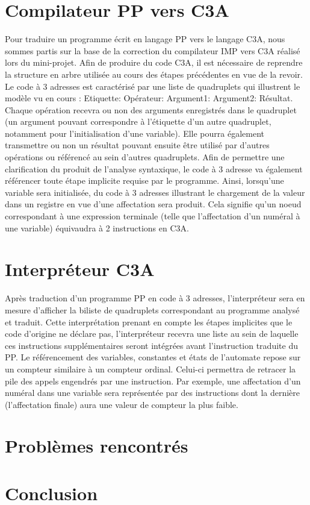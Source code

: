 \documentclass[11pt,a4paper]{article}
\begin{document}
\section{Compilateur PP vers C3A}
Pour traduire un programme écrit en langage PP vers le langage C3A, nous sommes partis sur la base de la correction du compilateur IMP vers C3A réalisé lors du mini-projet.
Afin de produire du code C3A, il est nécessaire de reprendre la structure en arbre utilisée au cours des étapes précédentes en vue de la revoir.
Le code à 3 adresses est caractérisé par une liste de quadruplets qui illustrent le modèle vu en cours :
Etiquette: Opérateur: Argument1: Argument2: Résultat.
Chaque opération recevra ou non des arguments enregistrés dans le quadruplet (un argument pouvant correspondre à l'étiquette d'un autre quadruplet, notamment pour l'initialisation d'une variable).
Elle pourra également transmettre ou non un résultat pouvant ensuite être utilisé par d'autres opérations ou référencé au sein d'autres quadruplets.
Afin de permettre une clarification du produit de l'analyse syntaxique, le code à 3 adresse va également référencer toute étape implicite requise par le programme.
Ainsi, lorsqu'une variable sera initialisée, du code à 3 adresses illustrant le chargement de la valeur dans un registre en vue d'une affectation sera produit.
Cela signifie qu'un noeud correspondant à une expression terminale (telle que l'affectation d'un numéral à une variable) équivaudra à 2 instructions en C3A.

\section{Interpréteur C3A}
Après traduction d'un programme PP en code à 3 adresses, l'interpréteur sera en mesure d'afficher la biliste de quadruplets correspondant au programme analysé et traduit.
Cette interprétation prenant en compte les étapes implicites que le code d'origine ne déclare pas, l'interpréteur recevra une liste au sein de laquelle ces instructions supplémentaires seront intégrées avant l'instruction traduite du PP.
Le référencement des variables, constantes et états de l'automate repose sur un compteur similaire à un compteur ordinal.
Celui-ci permettra de retracer la pile des appels engendrés par une instruction.
Par exemple, une affectation d'un numéral dans une variable sera représentée par des instructions dont la dernière (l'affectation finale) aura une valeur de compteur la plus faible.

\section{Problèmes rencontrés}


\section{Conclusion}
\end{document}
